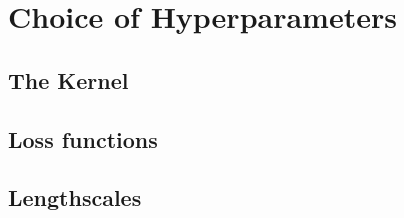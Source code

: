 \section{Choice of Hyperparameters}

\subsection{The Kernel}

\subsection{Loss functions}

\subsection{Lengthscales}


\clearpage
